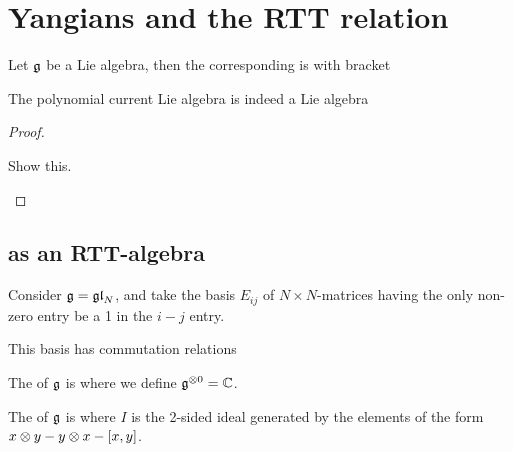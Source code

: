 \documentclass{article}
\begin{document}
\section{Yangians and the RTT relation}

\begin{definition}
Let $\mf{g}$ be a Lie algebra, then the corresponding  is 
with bracket 
\end{definition}

\begin{prop}
The polynomial current Lie algebra is indeed a Lie algebra
\end{prop}
\begin{proof}
\begin{ex}
Show this. 
\end{ex}
\end{proof}

\subsection{ as an RTT-algebra}

Consider $\mf{g} = \mf{gl}_N$, and take the basis $E_{ij}$ of $N \times N$-matrices having the only non-zero entry be a 1 in the $i-j$ entry. 

\begin{fact}
This basis has commutation relations 
\end{fact}

\begin{definition}
The  of $\mf{g}$ is 
where we define $\mf{g}^{\otimes 0} = \mbb{C}$. 
\end{definition}

\begin{definition}
The  of $\mf{g}$ is
where $I$ is the 2-sided ideal generated by the elements of the form $x \otimes y - y \otimes x - \comm[x]{y}$. 
\end{definition}
\end{document}
